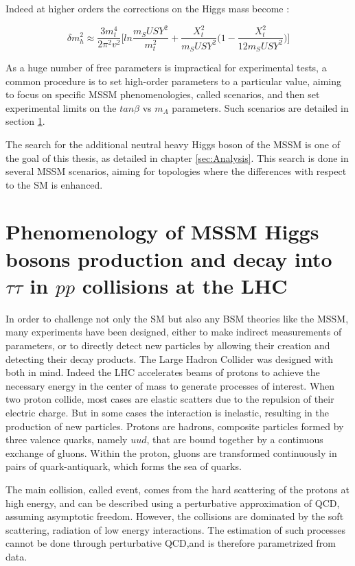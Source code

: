 Indeed at higher orders the corrections on the Higgs mass become \cite{Nagashima:2014tva} :

\begin{equation}
    \delta m_h^2 \approx \frac{3 m_t^4}{2\pi^2 v^2} \Big[ ln\frac{m_SUSY^2}{m_t^2} + \frac{X_t^2}{m_SUSY^2} \big( 1 - \frac{X_t^2}{12 m_SUSY^2} \big) \Big]
\end{equation}

As a huge number of free parameters is impractical for experimental tests, a common procedure is to set high-order parameters to a particular value, aiming to focus on specific MSSM phenomenologies, called scenarios, and then set experimental limits on the $tan \beta$ vs $m_A$ parameters. Such scenarios  are detailed in section \ref{sec:pheno}.

The search for the additional neutral heavy Higgs boson of the MSSM is one of the goal of this thesis, as detailed in chapter \ref{sec:Analysis}. This search is done in several MSSM scenarios, aiming for topologies where the differences with respect to the SM is enhanced. 

\section{Phenomenology of MSSM Higgs bosons production and decay into $\tau\tau$ in $pp$ collisions at the LHC}
\label{sec:pheno}

In order to challenge not only the SM but also any BSM theories like the MSSM, many experiments have been designed, either to make indirect measurements of parameters, or to directly detect new particles by allowing their creation and detecting their decay products. The Large Hadron Collider was designed with both in mind. Indeed the LHC accelerates beams of protons to achieve the necessary energy in the center of mass to generate processes of interest. When two proton collide, most cases are elastic scatters due to the repulsion of their electric charge. But in some cases the interaction is inelastic, resulting in the production of new particles. Protons are hadrons, composite particles formed by three valence quarks, namely $uud$, that are bound together by a continuous exchange of gluons. Within the proton, gluons are transformed continuously in pairs of quark-antiquark, which forms the sea of quarks.

The main collision, called event, comes from the hard scattering of the protons at high energy, and can be described using a perturbative approximation of QCD, assuming asymptotic freedom. However, the collisions are dominated by the soft scattering, radiation of low energy interactions. The estimation of such processes cannot be done through perturbative QCD,and is therefore parametrized from data.

